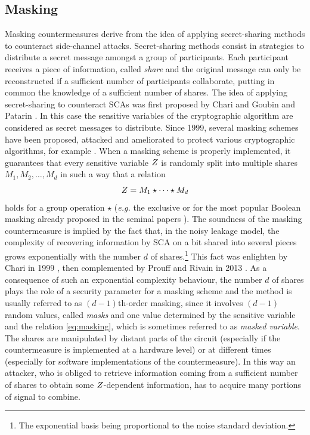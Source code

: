 \subsection{Masking}\label{sec:masking}
Masking countermeasures derive from the idea of applying secret-sharing methods to counteract side-channel attacks. Secret-sharing methods consist in strategies to distribute a secret message amongst a group of participants. Each participant receives a piece of information, called \emph{share} and the original message can only be reconstructed if a sufficient number of participants collaborate, putting in common the knowledge of a sufficient number of shares. The idea of applying secret-sharing to counteract SCAs was first proposed by Chari \etal \cite{chari1999towards} and Goubin and Patarin \cite{goubin1999and}. In this case the sensitive variables of the cryptographic algorithm are considered as secret messages to distribute. Since 1999, several masking schemes have been proposed, attacked and ameliorated to protect various cryptographic algorithms, for example \cite{messerges2000securing,akkar2001implementation,ishai2003private,blomer2004provably,oswald2005side,schramm2006higher,rivain2010provably,moradi2011pushing,coron2013higher,bilgin2014more,de2015higher,goudarzi2017fast,journault2017very}. When a masking scheme is properly implemented, it guarantees that every sensitive variable $Z$ is randomly split  into multiple shares $M_1,M_2,\dots,M_d$ in such a way that a relation 
\begin{equation}\label{eq:masking}
Z = M_1 \star \dots \star M_d
\end{equation}  holds for a group operation $\star$ (\emph{e.g.} the exclusive or for the most popular Boolean masking already proposed in the seminal papers \cite{chari1999towards,goubin1999and}). The soundness of the masking countermeasure is implied by the fact that, in the noisy leakage model, the complexity of recovering information by SCA on a bit shared into several pieces grows exponentially with the number $d$ of shares.\footnote{The exponential basis being proportional to the noise standard deviation.} This fact was enlighten by Chari \etal in 1999  \cite{chari1999towards}, then complemented by Prouff and Rivain in 2013 \cite{prouff2013masking}. As a consequence of such an exponential complexity behaviour, the number $d$ of shares plays the role of a security parameter for a masking scheme and the method is usually referred to as $(d-1)$th-order masking, since it involves $(d-1)$ random values, called \emph{masks} and one value determined by the sensitive variable and the relation \eqref{eq:masking}, which is sometimes referred to as \emph{masked variable}. The shares are manipulated by distant parts of the circuit (especially if the countermeasure is implemented at a hardware level) or at different times (especially for software implementations of the countermeasure). In this way an attacker, who is obliged to retrieve information coming from a sufficient number of shares to obtain some $Z$-dependent information, has to acquire many portions of signal to combine. \\

